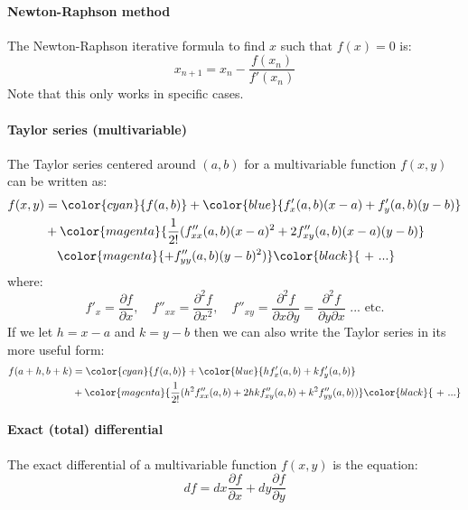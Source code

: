 \documentclass{scrartcl}
\begin{document}
\paragraph{Newton-Raphson method}
The Newton-Raphson iterative formula to find $ x $ such that $ f(x) = 0 $ is:
\begin{equation}
x_{n+1} = x_{n} - \frac{f(x_{n})}{f'(x_{n})}
\end{equation}
Note that this only works in specific cases.

\paragraph{Taylor series (multivariable)}
The Taylor series centered around $ (a, b) $ for a multivariable function $ f(x, y) $ can be written as:
\begin{align}
f(x, y) & = \color{cyan}{f(a, b)} + \color{blue}{f'_{x}(a, b)(x-a) + f'_{y}(a, b)(y-b)} \\
& + \color{magenta}{\frac{1}{2!}(f''_{xx}(a, b)(x-a)^{2} + 2f''_{xy}(a, b)(x-a)(y-b)} \\
& \ \ \ \color{magenta}{ + f''_{yy}(a, b)(y-b)^{2})} \color{black}{\textrm{ + ...}}
\end{align}
where:
\begin{equation}
f'_{x} = \frac{\partial f}{\partial x}, \quad f''_{xx} = \frac{\partial^{2} f}{\partial x^{2}}, \quad f''_{xy} = \frac{\partial^{2} f}{\partial x \partial y} = \frac{\partial^{2} f}{\partial y \partial x}\textrm{ ... etc.}
\end{equation}
If we let $ h = x - a $ and $ k = y - b $ then we can also write the Taylor series in its more useful form:
\begin{align}
f(a+h, b+k) & = \color{cyan}{f(a, b)} + \color{blue}{hf'_{x}(a, b) + kf'_{y}(a, b)} \\
& + \color{magenta}{\frac{1}{2!}(h^{2}f''_{xx}(a, b) + 2hkf''_{xy}(a, b) + k^{2}f''_{yy}(a, b))} \color{black}{\textrm{ + ...}}
\end{align}

\paragraph{Exact (total) differential}
The exact differential of a multivariable function $ f(x, y) $ is the equation:
\begin{equation}
df = dx \frac{\partial f}{\partial  x} + dy \frac{\partial f}{\partial  y}
\end{equation}
\end{document}
